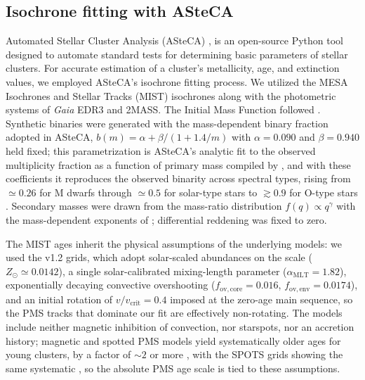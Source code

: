 \documentclass{aa}
\begin{document}
\subsection{Isochrone fitting with ASteCA}\label{subsec:asteca}
Automated Stellar Cluster Analysis (ASteCA) \citep{2015A&A...576A...6P}, is an open-source Python tool designed to automate standard tests for determining basic parameters of stellar clusters. For accurate estimation of a cluster's metallicity, age, and extinction values, we employed ASteCA's isochrone fitting process. We utilized the MESA Isochrones and Stellar Tracks (\textsc{MIST}) isochrones \citep{2016ApJS..222....8D, 2016ApJ...823..102C} along with the photometric systems of \textit{Gaia} EDR3 and \textsc{2MASS}. The Initial Mass Function followed \citet{2014ApJ...796...75C}. Synthetic binaries were generated with the mass-dependent binary fraction adopted in ASteCA, $b(m)=\alpha+\beta/(1+1.4/m)$ with $\alpha=0.090$ and $\beta=0.940$ held fixed; this parametrization is ASteCA's analytic fit to the observed multiplicity fraction as a function of primary mass compiled by \citet{2023ASPC..534..275O}, and with these coefficients it reproduces the observed binarity across spectral types, rising from $\simeq0.26$ for M dwarfs through $\simeq0.5$ for solar-type stars to $\gtrsim0.9$ for O-type stars \citep{2013ARA&A..51..269D,2017ApJS..230...15M}. Secondary masses were drawn from the mass-ratio distribution $f(q)\propto q^{\gamma}$ with the mass-dependent exponents of \citet{2013ARA&A..51..269D}; differential reddening was fixed to zero.

The \textsc{MIST} ages inherit the physical assumptions of the underlying models: we used the v1.2 grids, which adopt solar-scaled abundances on the \citet{2009ARA&A..47..481A} scale ($Z_\odot\simeq0.0142$), a single solar-calibrated mixing-length parameter ($\alpha_{\mathrm{MLT}}=1.82$), exponentially decaying convective overshooting ($f_{\mathrm{ov,core}}=0.016$, $f_{\mathrm{ov,env}}=0.0174$), and an initial rotation of $v/v_{\mathrm{crit}}=0.4$ imposed at the zero-age main sequence, so the PMS tracks that dominate our fit are effectively non-rotating. The models include neither magnetic inhibition of convection, nor starspots, nor an accretion history; magnetic and spotted PMS models yield systematically older ages for young clusters, by a factor of $\sim2$ or more \citep{2016A&A...593A..99F,2015ApJ...807..174S}, with the SPOTS grids showing the same systematic \citep{2020ApJ...891...29S}, so the absolute PMS age scale is tied to these assumptions.
\end{document}
